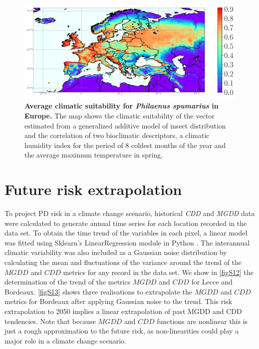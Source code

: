 \begin{figure}[H]
    \centering
    \includegraphics[width=1\textwidth]{Figures/vector_layer.png}
    \caption[Average climatic suitability for \textit{Philaenus
            spumarius} in Europe]{\textbf{Average climatic suitability for
            \textit{Philaenus
                spumarius} in Europe.} The map shows the climatic suitability
        of the vector
        estimated from a generalized additive model of insect distribution and
        the
        correlation of two bioclimatic descriptors, a climatic humidity index
        for the
        period of 8 coldest months of the year and the average maximum
        temperature in
        spring.}
    \label{fig:sup_vector} %
\end{figure}

\section{Future risk extrapolation}\label{app:future}

To project PD risk in a climate change scenario, historical \textit{CDD}
and \textit{MGDD} data were calculated to generate annual time series for each
location recorded in the data set. To obtain the time trend of the variables in
each pixel, a linear model was fitted using Sklearn's LinearRegression module
in Python \cite{scikit-learn}. The interannual climatic variability was also
included as a Gaussian noise distribution by calculating the mean and
fluctuations of the variance around the trend of the $MGDD$ and $CDD$ metrics
for any record in the data set. We show in \cref{figS12} the determination of
the trend of the metrics $MGDD$ and $CDD$ for Lecce and Bordeaux. \cref{figS13}
shows three realisations to extrapolate the $MGDD$ and $CDD$ metrics for
Bordeaux after applying Gaussian noise to the trend. This risk extrapolation to
2050 implies a linear extrapolation of past MGDD and CDD tendencies. Note that
because $MGDD$ and $CDD$ functions are nonlinear this is just a rough
approximation to the future risk, as non-linearities could play a major role in
a climate change scenario.


